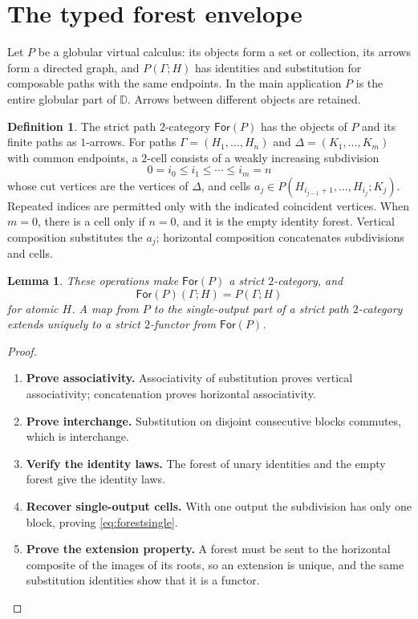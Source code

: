 \documentclass[11pt,reqno]{amsart}
\theoremstyle{plain}
\newtheorem{lemma}[theorem]{Lemma}
\theoremstyle{definition}
\newtheorem{definition}[theorem]{Definition}
\theoremstyle{remark}
\numberwithin{equation}{section}
\newcommand{\D}{\mathbb D}
\newcommand{\Forest}{\mathsf{For}}
\begin{document}
\section{The typed forest envelope}\label{sec:forest}

Let $P$ be a globular virtual calculus: its objects form a set or collection,
its arrows form a directed graph, and $P(\Gamma;H)$ has identities and
substitution for composable paths with the same endpoints. In the main
application $P$ is the entire globular part of $\D$. Arrows between
different objects are retained.

\begin{definition}\label{def:forest}
The strict path $2$-category $\Forest(P)$ has the objects of $P$ and its
finite paths as $1$-arrows. For paths $\Gamma=(H_1,\ldots,H_n)$ and
$\Delta=(K_1,\ldots,K_m)$ with common endpoints, a $2$-cell consists of
a weakly increasing subdivision
\[
 0=i_0\leq i_1\leq\cdots\leq i_m=n
\]
whose cut vertices are the vertices of $\Delta$, and cells
$a_j\in P(H_{i_{j-1}+1},\ldots,H_{i_j};K_j)$.
Repeated indices are permitted only with the indicated coincident vertices.
When $m=0$, there is a cell only if $n=0$, and it is the empty identity
forest. Vertical composition substitutes the $a_j$; horizontal composition
concatenates subdivisions and cells.
\end{definition}

\begin{lemma}\label{lem:forest}
These operations make $\Forest(P)$ a strict $2$-category, and
\begin{equation}\label{eq:forestsingle}
 \Forest(P)(\Gamma;H)=P(\Gamma;H)
\end{equation}
for atomic $H$. A map from $P$ to the single-output part of a strict path
$2$-category extends uniquely to a strict $2$-functor from $\Forest(P)$.
\end{lemma}
\begin{proof}\leavevmode
\begin{enumerate}
\item \textbf{Prove associativity.} Associativity of substitution proves vertical associativity; concatenation
proves horizontal associativity.

\item \textbf{Prove interchange.} Substitution on disjoint consecutive blocks
commutes, which is interchange.

\item \textbf{Verify the identity laws.} The forest of unary identities and the
empty forest give the identity laws.

\item \textbf{Recover single-output cells.} With one output the subdivision has
only one block, proving \cref{eq:forestsingle}.

\item \textbf{Prove the extension property.} A forest must be sent to
the horizontal composite of the images of its roots, so an extension is
unique, and the same substitution identities show that it is a functor.\qedhere
\end{enumerate}
\end{proof}
\end{document}
